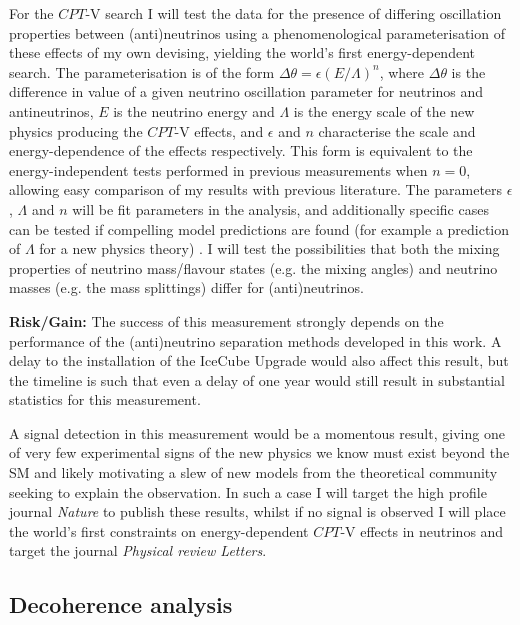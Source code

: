 \documentclass[a4paper,11pt]{article}
\begin{document}
For the $CPT$-V search I will test the data for the presence of differing oscillation properties between (anti)neutrinos using a phenomenological parameterisation of these effects of my own devising, yielding the world's first energy-dependent search. The parameterisation is of the form $\Delta \theta = \epsilon (E/\Lambda)^n$, where $\Delta \theta$ is the difference in value of a given neutrino oscillation parameter for neutrinos and antineutrinos, $E$ is the neutrino energy and $\Lambda$ is the energy scale of the new physics producing the $CPT$-V effects, and $\epsilon$ and $n$ characterise the scale and energy-dependence of the effects respectively. This form is equivalent to the energy-independent tests performed in previous measurements when $n=0$, allowing easy comparison of my results with previous literature. The parameters $\epsilon$, $\Lambda$ and $n$ will be fit parameters in the analysis, and additionally specific cases can be tested if compelling model predictions are found (for example a prediction of $\Lambda$ for a new physics theory) . I will test the possibilities that both the mixing properties of neutrino mass/flavour states (e.g. the mixing angles) and neutrino masses (e.g. the mass splittings) differ for (anti)neutrinos. 

\textbf{Risk/Gain:} The success of this measurement strongly depends on the performance of the (anti)neutrino separation methods developed in this work. A delay to the installation of the IceCube Upgrade would also affect this result, but the timeline is such that even a delay of one year would still result in substantial statistics for this measurement.

A signal detection in this measurement would be a momentous result, giving one of very few experimental signs of the new physics we know must exist beyond the SM and likely motivating a slew of new models from the theoretical community seeking to explain the observation. In such a case I will target the high profile journal \textit{Nature} to publish these results, whilst if no signal is observed I will place the world's first constraints on energy-dependent $CPT$-V effects in neutrinos and target the journal \textit{Physical review Letters}.\\

\subsection{Decoherence analysis}
\end{document}
